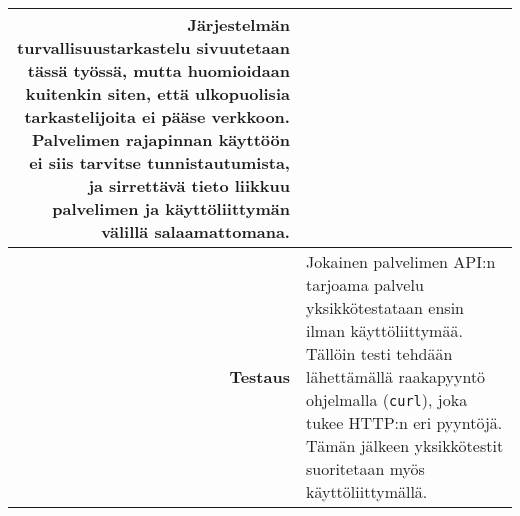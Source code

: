 \documentclass[a4paper, 12pt]{article}
\begin{document}
\begin{tabular}{|r|l|}
\begin{minipage}[t]{0.75\textwidth}
	Järjestelmän turvallisuustarkastelu sivuutetaan tässä työssä, mutta huomioidaan kuitenkin siten, että ulkopuolisia tarkastelijoita ei pääse verkkoon. Palvelimen rajapinnan käyttöön ei siis tarvitse tunnistautumista, ja sirrettävä tieto liikkuu palvelimen ja käyttöliittymän välillä salaamattomana.
	\end{minipage} \\ \hline
	\begin{minipage}[t]{0.2\textwidth}
	\hfill \textbf{Testaus}
	\end{minipage} & 
	\begin{minipage}[t]{0.75\textwidth}
	Jokainen palvelimen API:n tarjoama palvelu yksikkötestataan ensin ilman käyttöliittymää. Tällöin testi tehdään lähettämällä raakapyyntö ohjelmalla (\texttt{curl}), joka tukee HTTP:n eri pyyntöjä. Tämän jälkeen yksikkötestit suoritetaan myös käyttöliittymällä.
	\end{minipage} \\ \hline
\end{tabular}
	
\end{document}
